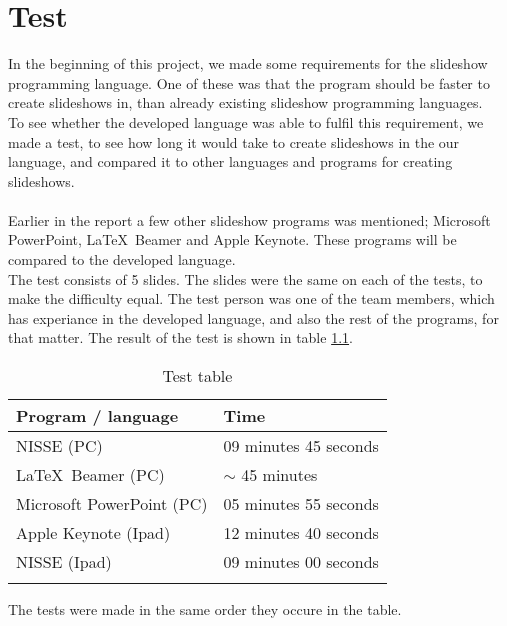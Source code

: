 \chapter{Test}
In the beginning of this project, we made some requirements for the slideshow programming language. One of these was that the program should be faster to create slideshows in, than already existing slideshow programming languages. \\
To see whether the developed language was able to fulfil this requirement, we made a test, to see how long it would take to create slideshows in the our language, and compared it to other languages and programs for creating slideshows.
\\ \\
Earlier in the report a few other slideshow programs was mentioned; Microsoft PowerPoint, \LaTeX~Beamer and Apple Keynote. These programs will be compared to the developed language.\\
The test consists of 5 slides. The slides were the same on each of the tests, to make the difficulty equal. The test person was one of the team members, which has experiance in the developed language, and also the rest of the programs, for that matter.
The result of the test is shown in table \ref{tbl:TestTable}.
\begin{table}
\centering
   \begin{tabular}{ | l | l |}
    \hline
    Program / language & Time \\ \hline
    NISSE (PC) & 09 minutes 45 seconds \\ 
    \LaTeX~Beamer (PC) & $\sim$ 45 minutes \\
    Microsoft PowerPoint (PC) & 05 minutes 55 seconds \\ 
    Apple Keynote (Ipad) & 12 minutes 40 seconds \\ 
    NISSE (Ipad) & 09 minutes 00 seconds \\ \hline
    \caption{Test table}
    \end{tabular}
    
    \label{tbl:TestTable}
\end{table}
The tests were made in the same order they occure in the table.\\


